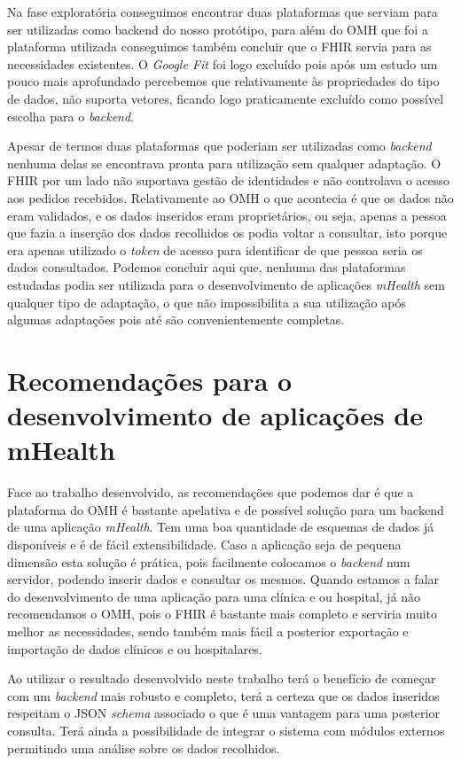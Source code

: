 Na fase exploratória conseguimos encontrar duas plataformas que serviam para ser utilizadas como backend do nosso protótipo, para além do \gls{OMH} que foi a plataforma utilizada conseguimos também concluir que o \gls{FHIR} servia para as necessidades existentes. O \textit{Google Fit} foi logo excluído pois após um estudo um pouco mais aprofundado percebemos que relativamente às propriedades do tipo de dados, não suporta vetores, ficando logo praticamente excluído como possível escolha para o \textit{backend}.\par 
Apesar de termos duas plataformas que poderiam ser utilizadas como \textit{backend} nenhuma delas se encontrava pronta para utilização sem qualquer adaptação. O \gls{FHIR} por um lado não suportava gestão de identidades e não controlava o acesso aos pedidos recebidos. Relativamente ao \gls{OMH} o que acontecia é que os dados não eram validados, e os dados inseridos eram proprietários, ou seja, apenas a pessoa que fazia a inserção dos dados recolhidos os podia voltar a consultar, isto porque era apenas utilizado o \textit{token} de acesso para identificar de que pessoa seria os dados consultados.
Podemos concluir aqui que, nenhuma das plataformas estudadas podia ser utilizada para o desenvolvimento de aplicações \textit{mHealth} sem qualquer tipo de adaptação, o que não impossibilita a sua utilização após algumas adaptações pois até são convenientemente completas.

\section{Recomendações para o desenvolvimento de aplicações de mHealth}


Face ao trabalho desenvolvido, as recomendações que podemos dar é que a plataforma do \gls{OMH} é bastante apelativa e de possível solução para um backend de uma aplicação \textit{mHealth}. Tem uma boa quantidade de esquemas de dados já disponíveis e é de fácil extensibilidade. Caso a aplicação seja de pequena dimensão esta solução é prática, pois facilmente colocamos o \textit{backend} num servidor, podendo inserir dados e consultar os mesmos. Quando estamos a falar do desenvolvimento de uma aplicação para uma clínica e ou hospital, já não recomendamos o \gls{OMH}, pois o \gls{FHIR} é bastante mais completo e serviria muito melhor as necessidades, sendo também mais fácil a posterior exportação e importação de dados clínicos e ou hospitalares. \par
Ao utilizar o resultado desenvolvido neste trabalho terá o benefício de começar com um \textit{backend} mais robusto e completo, terá a certeza que os dados inseridos respeitam o \gls{JSON} \textit{schema} associado o que é uma vantagem para uma posterior consulta. Terá ainda a possibilidade de integrar o sistema com módulos externos permitindo uma análise sobre os dados recolhidos.


\cleardoublepage